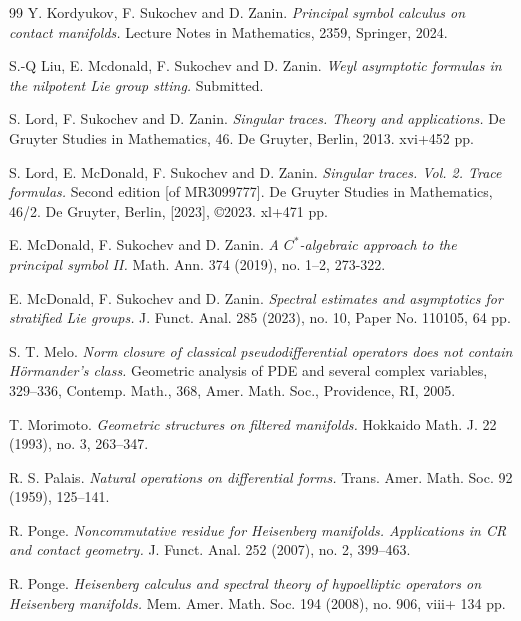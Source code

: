 \documentclass[leqno]{amsart}
\begin{document}
\begin{thebibliography}{99}
Y. Kordyukov, F. Sukochev and D. Zanin.
{\it Principal symbol calculus on contact manifolds.}
Lecture Notes in Mathematics, 2359, Springer, 2024.

S.-Q Liu, E. Mcdonald, F. Sukochev and D. Zanin.
{\it Weyl asymptotic formulas in the nilpotent Lie group stting.}
Submitted.

S. Lord, F. Sukochev and D. Zanin. 
{\it Singular traces. Theory and applications.} 
De Gruyter Studies in Mathematics, 46. De Gruyter, Berlin, 2013. xvi+452 pp.


S. Lord, E. McDonald, F. Sukochev and D. Zanin.  
{\it Singular traces. Vol. 2. Trace formulas.} Second edition [of MR3099777]. De Gruyter Studies in Mathematics, 46/2. De Gruyter, Berlin, [2023], ©2023. xl+471 pp.

E. McDonald, F. Sukochev and D. Zanin.  
{\it A $C^{\ast}$-algebraic approach to the principal symbol II.} 
Math. Ann. 374 (2019), no. 1--2, 273-322.

E. McDonald, F. Sukochev and D. Zanin.   
{\it Spectral estimates and asymptotics for stratified Lie groups.} 
J. Funct. Anal. 285 (2023), no. 10, Paper No. 110105, 64 pp.

S. T. Melo.
{\it Norm closure of classical pseudodifferential operators does not contain Hörmander's class.}  
Geometric analysis of PDE and several complex variables, 329--336, Contemp. Math., 368, Amer. Math. Soc., Providence, RI, 2005.

T. Morimoto.
{\it Geometric structures on filtered manifolds.}
Hokkaido Math. J. 22 (1993), no. 3, 263--347.


R. S. Palais. 
{\it Natural operations on differential forms.} 
Trans. Amer. Math. Soc. 92 (1959), 125--141.

R. Ponge.
{\it Noncommutative residue for Heisenberg manifolds. Applications in CR and contact geometry.}
J. Funct. Anal. 252 (2007), no. 2, 399--463.

R. Ponge. 
{\it Heisenberg calculus and spectral theory of hypoelliptic operators on Heisenberg manifolds.} 
Mem. Amer. Math. Soc. 194 (2008), no. 906, viii+ 134 pp. 


\end{thebibliography}
\end{document}
